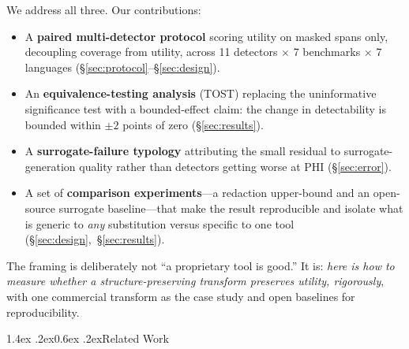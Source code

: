 \documentclass[11pt]{article}
\makeatletter
\renewcommand\section{\@startsection{section}{1}{\z@}%
  {1.4ex \@plus.2ex}{0.6ex \@plus.2ex}{\normalfont\large\bfseries}}
\makeatother
\begin{document}
We address all three. Our contributions:
\begin{itemize}\itemsep2pt
\item A \textbf{paired multi-detector protocol} scoring utility on masked spans only, decoupling coverage from utility, across 11 detectors $\times$ 7 benchmarks $\times$ 7 languages (\S\ref{sec:protocol}--\S\ref{sec:design}).
\item An \textbf{equivalence-testing analysis} (TOST) replacing the uninformative significance test with a bounded-effect claim: the change in detectability is bounded within $\pm2$ points of zero (\S\ref{sec:results}).
\item A \textbf{surrogate-failure typology} attributing the small residual to surrogate-generation quality rather than detectors getting worse at PHI (\S\ref{sec:error}).
\item A set of \textbf{comparison experiments}---a redaction upper-bound and an open-source surrogate baseline---that make the result reproducible and isolate what is generic to \emph{any} substitution versus specific to one tool (\S\ref{sec:design},~\S\ref{sec:results}).
\end{itemize}
The framing is deliberately not ``a proprietary tool is good.'' It is: \emph{here is how to measure whether a structure-preserving transform preserves utility, rigorously}, with one commercial transform as the case study and open baselines for reproducibility.

\section{Related Work}
\end{document}
